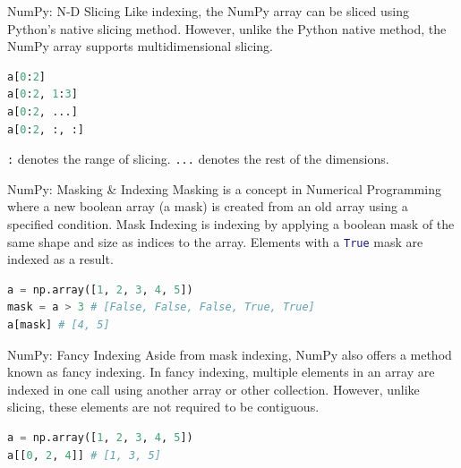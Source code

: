 \documentclass{beamer}
\begin{document}
    \begin{frame}[fragile]{NumPy: N-D Slicing}
        Like indexing, the NumPy array can be sliced using Python's native slicing method. However, unlike the Python native method, the NumPy array supports multidimensional slicing.
        \begin{example}
            \begin{lstlisting}[language=Python]
a[0:2]
a[0:2, 1:3]
a[0:2, ...]
a[0:2, :, :]
            \end{lstlisting}
        \end{example}
        \lstinline[language=Python]{:} denotes the range of slicing. \lstinline[language=Python]{...} denotes the rest of the dimensions.
    \end{frame}

    \begin{frame}[fragile]{NumPy: Masking \& Indexing}
        Masking is a concept in Numerical Programming where a new boolean array (a mask) is created from an old array using a specified condition.
        \pause
        Mask Indexing is indexing by applying a boolean mask of the same shape and size as indices to the array. Elements with a \lstinline[language=Python]{True} mask are indexed as a result.
        \begin{example}
            \begin{lstlisting}[language=Python]
a = np.array([1, 2, 3, 4, 5])
mask = a > 3 # [False, False, False, True, True]
a[mask] # [4, 5]
            \end{lstlisting}
        \end{example}
    \end{frame}

    \begin{frame}[fragile]{NumPy: Fancy Indexing}
        Aside from mask indexing, NumPy also offers a method known as fancy indexing. In fancy indexing, multiple elements in an array are indexed in one call using another array or other collection. However, unlike slicing, these elements are not required to be contiguous.
        \begin{example}
            \begin{lstlisting}[language=Python]
a = np.array([1, 2, 3, 4, 5])
a[[0, 2, 4]] # [1, 3, 5]
            \end{lstlisting}
        \end{example}
    \end{frame}
\end{document}
